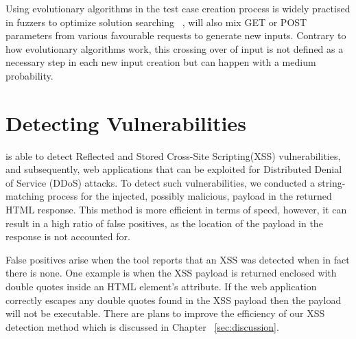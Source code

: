 Using evolutionary algorithms in the test case creation process is widely practised in fuzzers
to optimize solution searching ~\cite{seal2016Genetic}, \pname{} will also mix GET or POST parameters from various favourable requests to generate new inputs. Contrary to how evolutionary algorithms work, this crossing over of input is not defined as a necessary step in each new input creation but can happen with a medium probability.

\section{Detecting Vulnerabilities}
\pname{} is able to detect Reflected and Stored Cross-Site Scripting(XSS) vulnerabilities, and subsequently, web applications that can be exploited for Distributed Denial of Service (DDoS) attacks. To detect such vulnerabilities, we conducted a string-matching process for the injected, possibly malicious, payload in the returned HTML response. This method is more efficient in terms of speed, however, it can result in a high ratio of false positives, as the location of the payload in the response is not accounted for. 

False positives arise when the tool reports that an XSS was detected when in fact there is none. One example is when the XSS payload is returned enclosed with double quotes inside an HTML element's attribute. If the web application correctly escapes any double quotes found in the XSS payload then the payload will not be executable. There are plans to improve the efficiency of our XSS detection method which is discussed in Chapter ~\ref{sec:discussion}.
